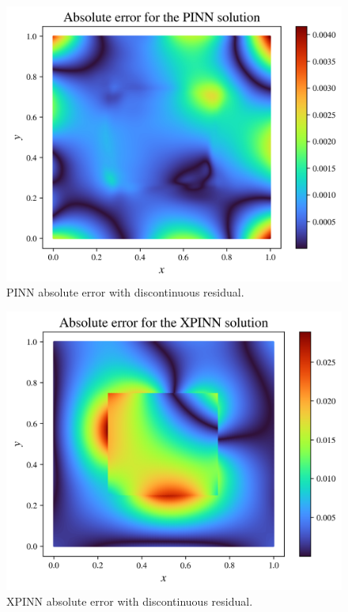 \begin{figure}[h]
    \centering
    \includegraphics[width=\linewidth]{Project1XPINNs/figures/Poisson/discrete_single_Poisson_error.pdf.png}
    \caption{PINN absolute error with discontinuous residual.}
    \label{fig:pinn_disc_error}
\end{figure}

\begin{figure}[h]
    \centering
    \includegraphics[width=\linewidth]{Project1XPINNs/figures/Poisson/new_exp/discrete_xpinn_Poisson_error.png}
    \caption{XPINN absolute error with discontinuous residual.}
    \label{fig:xpinn_disc_error}
\end{figure}

